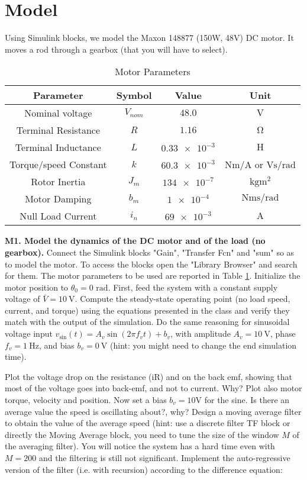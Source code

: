 \documentclass[11pt]{article}
\begin{document}
\section{Model}
Using Simulink blocks, we model the Maxon 148877 (150W, 48V) DC motor. It moves a rod through a gearbox (that you will have to select).
%
\begin{table}[bth]
	\centering
	\begin{tabular}{cccc}
		Parameter       & Symbol      & Value & Unit\\
		\hline \hline
		Nominal voltage & $V_{nom}$ & $48.0$ & $\mathrm{V}$\\
		Terminal Resistance & $R$ & $1.16$ & $\mathrm{\Omega}$ \\
		Terminal Inductance & $L$ & $\num{0.33e-3}$ & $\mathrm{H}$ \\
		Torque/speed Constant & $k$  & $\num{60.3e-3}$ & $\mathrm{Nm/A}$ or $\mathrm{Vs/rad}$ \\
		Rotor Inertia & $J_m$ & $\num{134e-7}$ & $\mathrm{kgm^2}$ \\
		Motor Damping & $b_m$ & $\num{1e-4}$ & $\mathrm{Nms/rad}$ \\
		Null Load Current & $i_n$ & $\num{69e-3}$ & $\mathrm{A}$ 
	\end{tabular}
	\caption{Motor Parameters}
	\label{motor_data}
\end{table}

%
\par
\textbf{M1. Model the dynamics of the DC motor and of the load (no gearbox).} 
Connect the Simulink blocks "Gain", "Transfer Fcn" and "sum" so as to model the motor. To access the blocks 
open the "Library Browser" and search for them. The motor parameters to be used are reported in Table \ref{motor_data}. 
Initialize the motor position to $\theta_0 = 0$   $\mathrm{rad}$. 
First, feed the system with a constant supply voltage of $\bar{V} = 10 \ \mathrm{V}$. 
Compute the steady-state operating point (no load speed, current, and torque) using the equations presented in the class and verify they match with the output of the simulation. %
Do the same reasoning for sinusoidal voltage input $v_{\sin} (t) = A_v\sin(2 \pi f_v t)+b_v$, 
with amplitude $A_v = 10 \ \mathrm{V}$, phase $f_v = 1 \ \mathrm{Hz}$, and bias 
$b_v = 0 \ \mathrm{V}$ (hint: you might need to change the end simulation time).
 
Plot the voltage drop on the resistance (iR) and on the back emf,  
showing that most of the voltage goes into back-emf, and not to current. Why? 
Plot also motor torque, velocity and position. Now set a  bias $b_v = 10 \mathrm{V}$ for the sine. 
Is there an average value the speed is oscillating about?, why? 
Design a moving average filter to obtain the value of the average speed (hint: use a 
discrete filter TF block or directly the Moving Average block, you need to tune the 
size of the window $M$ of the averaging filter). You will notice the system has a hard 
time even with $M = 200$ and the filtering is still not significant. 
Implement the auto-regressive version of the filter (i.e. with recursion) according to the difference equation:
\end{document}
